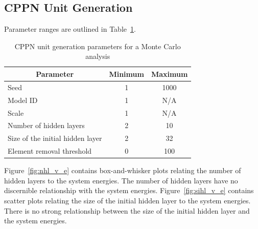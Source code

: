 \subsection{CPPN Unit Generation}

Parameter ranges are outlined in Table~\ref{tab:cppnmc}.

\begin{table}[H]
\centering
\caption{CPPN unit generation parameters for a Monte Carlo analysis}
\label{tab:cppnmc}
\begin{tabular}{@{}lcc@{}}
\toprule
\multicolumn{1}{c}{\textbf{Parameter}} & \textbf{Minimum} & \textbf{Maximum} \\ \midrule
Seed                                   & 1                & 1000             \\
Model ID                               & 1                & N/A              \\
Scale                                  & 1                & N/A              \\
Number of hidden layers                & 2                & 10               \\
Size of the initial hidden layer       & 2                & 32               \\
Element removal threshold              & 0                & 100              \\ \bottomrule
\end{tabular}
\end{table}

Figure~\ref{fig:nhl_v_e} contains box-and-whisker plots relating the number of hidden layers to the system energies. The number of hidden layers have no discernible relationship with the system energies. Figure~\ref{fig:sihl_v_e} contains scatter plots relating the size of the initial hidden layer to the system energies. There is no strong relationship between the size of the initial hidden layer and the system energies.


